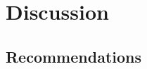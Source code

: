 \documentclass[preprint,letterpaper,floatfix,citeautoscript,aip,jcp]{revtex4-1}
\begin{document}

\section{Discussion} \label{Discussion} 

\subsection{Recommendations} \label{Recommendations}


\end{document}
